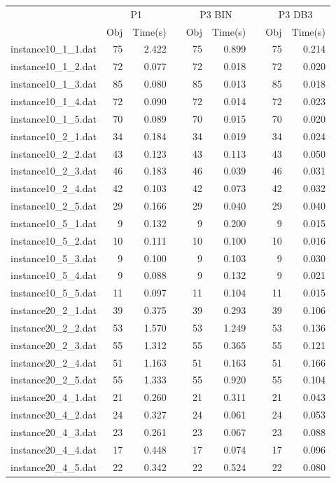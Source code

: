 \begin{table*}[h!]\centering
{}
\begin{tabular}{@{}rrrcrrcrr@{}}\toprule
& \multicolumn{2}{c}{P1} & \phantom{abc} & \multicolumn{2}{c}{P3 BIN} & \phantom{abc} & \multicolumn{2}{c}{P3 DB3}\\
\cmidrule{2-3} \cmidrule{5-6} \cmidrule{8-9}
& Obj & Time(s) & & Obj & Time(s) & & Obj & Time(s)\\ \midrule
instance10\_1\_1.dat & 75 & 2.422 & & 75 & 0.899 & & 75 & 0.214 \\
instance10\_1\_2.dat & 72 & 0.077 & & 72 & 0.018 & & 72 & 0.020 \\
instance10\_1\_3.dat & 85 & 0.080 & & 85 & 0.013 & & 85 & 0.018 \\
instance10\_1\_4.dat & 72 & 0.090 & & 72 & 0.014 & & 72 & 0.023 \\
instance10\_1\_5.dat & 70 & 0.089 & & 70 & 0.015 & & 70 & 0.020 \\
instance10\_2\_1.dat & 34 & 0.184 & & 34 & 0.019 & & 34 & 0.024 \\
instance10\_2\_2.dat & 43 & 0.123 & & 43 & 0.113 & & 43 & 0.050 \\
instance10\_2\_3.dat & 46 & 0.183 & & 46 & 0.039 & & 46 & 0.031 \\
instance10\_2\_4.dat & 42 & 0.103 & & 42 & 0.073 & & 42 & 0.032 \\
instance10\_2\_5.dat & 29 & 0.166 & & 29 & 0.040 & & 29 & 0.040 \\
instance10\_5\_1.dat & 9 & 0.132 & & 9 & 0.200 & & 9 & 0.015 \\
instance10\_5\_2.dat & 10 & 0.111 & & 10 & 0.100 & & 10 & 0.016 \\
instance10\_5\_3.dat & 9 & 0.100 & & 9 & 0.103 & & 9 & 0.030 \\
instance10\_5\_4.dat & 9 & 0.088 & & 9 & 0.132 & & 9 & 0.021 \\
instance10\_5\_5.dat & 11 & 0.097 & & 11 & 0.104 & & 11 & 0.015 \\
instance20\_2\_1.dat & 39 & 0.375 & & 39 & 0.293 & & 39 & 0.106 \\
instance20\_2\_2.dat & 53 & 1.570 & & 53 & 1.249 & & 53 & 0.136 \\
instance20\_2\_3.dat & 55 & 1.312 & & 55 & 0.365 & & 55 & 0.121 \\
instance20\_2\_4.dat & 51 & 1.163 & & 51 & 0.163 & & 51 & 0.166 \\
instance20\_2\_5.dat & 55 & 1.333 & & 55 & 0.920 & & 55 & 0.104 \\
instance20\_4\_1.dat & 21 & 0.260 & & 21 & 0.311 & & 21 & 0.043 \\
instance20\_4\_2.dat & 24 & 0.327 & & 24 & 0.061 & & 24 & 0.053 \\
instance20\_4\_3.dat & 23 & 0.261 & & 23 & 0.067 & & 23 & 0.088 \\
instance20\_4\_4.dat & 17 & 0.448 & & 17 & 0.074 & & 17 & 0.096 \\
instance20\_4\_5.dat & 22 & 0.342 & & 22 & 0.524 & & 22 & 0.080 \\
\end{tabular}
\end{table*}
